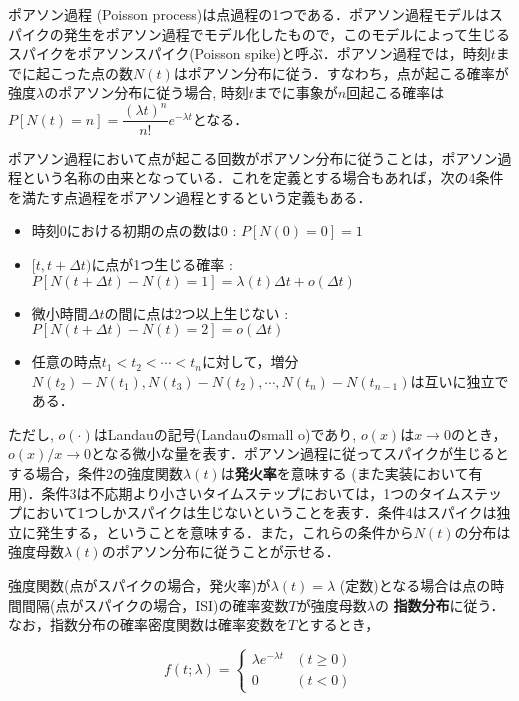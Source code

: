 ポアソン過程 (Poisson process)は点過程の1つである．ポアソン過程モデルはスパイクの発生をポアソン過程でモデル化したもので，このモデルによって生じるスパイクをポアソンスパイク(Poisson spike)と呼ぶ．ポアソン過程では，時刻$t$までに起こった点の数$N(t)$はポアソン分布に従う．すなわち，点が起こる確率が強度$\lambda$のポアソン分布に従う場合, 時刻$t$までに事象が$n$回起こる確率は$P[N(t)=n]=\dfrac{(\lambda t)^{n}}{n !} e^{-\lambda t}$となる． 

ポアソン過程において点が起こる回数がポアソン分布に従うことは，ポアソン過程という名称の由来となっている．これを定義とする場合もあれば，次の4条件を満たす点過程をポアソン過程とするという定義もある．

\begin{itemize}
\item 時刻0における初期の点の数は0 : $P[N(0)=0]=1$ 
\item $[t, t+\Delta t)$に点が1つ生じる確率 : $P[N(t+\Delta t)-N(t)=1]=\lambda(t)\Delta t+o(\Delta t)$
\item 微小時間$\Delta t$の間に点は2つ以上生じない : $P[N(t+\Delta t)-N(t)=2]=o(\Delta t)$
\item 任意の時点$t_1 < t_2 < \cdots< t_n$に対して，増分 $N(t_2)-N(t_1), N(t_3)-N(t_2), \cdots, N(t_n)-N(t_{n−1})$は互いに独立である．
\end{itemize}

ただし, $o(\cdot)$はLandauの記号(Landauのsmall o)であり, $o(x)$は$x\to 0$のとき，$o(x)/x\to 0$となる微小な量を表す．ポアソン過程に従ってスパイクが生じるとする場合，条件2の強度関数$\lambda(t)$は\textbf{発火率}を意味する (また実装において有用)．条件3は不応期より小さいタイムステップにおいては，1つのタイムステップにおいて1つしかスパイクは生じないということを表す．条件4はスパイクは独立に発生する，ということを意味する．また，これらの条件から$N(t)$の分布は強度母数$\lambda(t)$のポアソン分布に従うことが示せる．

強度関数(点がスパイクの場合，発火率)が$\lambda(t)=\lambda$ (定数)となる場合は点の時間間隔(点がスパイクの場合，ISI)の確率変数$T$が強度母数$\lambda$の \textbf{指数分布}に従う．なお，指数分布の確率密度関数は確率変数を$T$とするとき，


\begin{equation}
f(t;\lambda )=\left\{{\begin{array}{ll}\lambda e^{-\lambda t}&(t\geq 0)\\0&(t<0)\end{array}}\right.
\end{equation}


